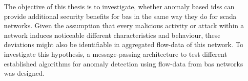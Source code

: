 
\begin{comment}
\begin{itemize}
	\item experiment
	\item test data captured from a floor section of the computer science building
	\item enriched with malicious packets to keep consistent
	
	\item (focusses only a purpose based) attack classes (cf. \parencite{Uma2013})
		\subitem \gls{dos}
			\subsubitem Short circuit -> blackout on entire line
			\subsubitem flooding of \code{A\_Restart} telegrams
			\subsubitem flooding nonsense
		\subitem replay
			\subsubitem repeating a time window
			\subsubitem sniff a tag and repeat it compressed??? \alert{whatever this means?}
			\subsubitem do inverse action
		\subitem manipulation/reconfiguration
			\subsubitem telegram manipulation
			\subsubitem reconfiguration of devices (Access Attack)
			\subsubitem reconfigure line couplers/make them useless (Access Attack)
		\subitem spoofing 
		\subitem Reconnaissance Attack
			\subsubitem network mapping
			
		\subitem 
	
	\item aim is to show if attacks can be identified by anomaly detection on flow data
		\subitem under the assumption, that attacks noticeable alter the characteristic and behaviour of \gls{knx} traffic
		\subitem cf. \parencite{Mukherjee1994,Yang2006,Pan2014}
	\item demonstrate a message-passing architecture to perform online analytics on \gls{knx} flow-data
	\item benchmark different algorithms against each other
\end{itemize}
\end{comment}

The objective of this thesis is to investigate, whether anomaly based \glspl{ids} can provide additional security benefits for \gls{bas} in the same way they do for \gls{scada} networks. %
Given the assumption that every malicious activity or attack within a network induces noticeable different characteristics and behaviour, these deviations might also be identifiable in aggregated flow-data of this network. \parencite[cf.][]{Mukherjee1994,Yang2006,Pan2014}
To investigate this hypothesis, a message-passing architecture to test different established algorithms for anomaly detection using flow-data from \gls{bas} networks was designed.

